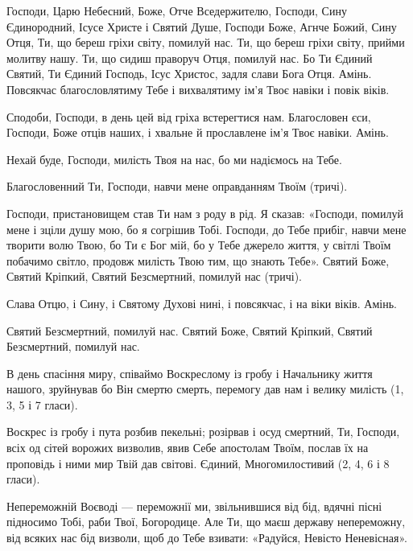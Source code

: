 \documentclass[chapters.tex]{subfiles}
\begin{document}
Господи, Царю Небесний, Боже, Отче Вседержителю, Господи, Сину Єдинородний, Ісусе Христе і Святий Душе, Господи Боже, Агнче Божий, Сину Отця, Ти, що береш гріхи світу, помилуй нас. Ти, що береш гріхи світу, прийми молитву нашу. Ти, що сидиш праворуч Отця, помилуй нас. Бо Ти Єдиний Святий, Ти Єдиний Господь, Ісус Христос, задля слави Бога Отця. Амінь. Повсякчас благословлятиму Тебе і вихвалятиму ім’я Твоє навіки і повік віків.

Сподоби, Господи, в день цей від гріха встерегтися нам. Благословен єси, Господи, Боже отців наших, і хвальне й прославлене ім’я Твоє навіки. Амінь.

Нехай буде, Господи, милість Твоя на нас, бо ми надіємось на Тебе.

Благословенний Ти, Господи, навчи мене оправданням Твоїм (тричі).

Господи, пристановищем став Ти нам з роду в рід. Я сказав: «Господи, помилуй мене і зціли душу мою, бо я согрішив Тобі. Господи, до Тебе прибіг, навчи мене творити волю Твою, бо Ти є Бог мій, бо у Тебе джерело життя, у світлі Твоїм побачимо світло, продовж милість Твою тим, що знають Тебе». Святий Боже, Святий Кріпкий, Святий Безсмертний, помилуй нас (тричі).

Слава Отцю, і Сину, і Святому Духові нині, і повсякчас, і на віки віків. Амінь.

Святий Безсмертний, помилуй нас. Святий Боже, Святий Кріпкий, Святий Безсмертний, помилуй нас.

В день спасіння миру, співаймо Воскреслому із гробу і Начальнику життя нашого, зруйнував бо Він смертю смерть, перемогу дав нам і велику милість (1, 3, 5 і 7 гласи).

Воскрес із гробу і пута розбив пекельні; розірвав і осуд смертний, Ти, Господи, всіх од сітей ворожих визволив, явив Себе апостолам Твоїм, послав їх на проповідь і ними мир Твій дав світові. Єдиний, Многомилостивий (2, 4, 6 і 8 гласи).

Непереможній Воєводі — переможнії ми, звільнившися від бід, вдячні пісні підносимо Тобі, раби Твої, Богородице. Але Ти, що маєш державу непереможну, від всяких нас бід визволи, щоб до Тебе взивати: «Радуйся, Невісто Неневісная».
\end{document}
